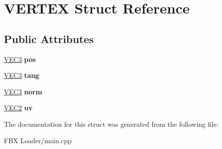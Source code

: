 \hypertarget{struct_v_e_r_t_e_x}{}\section{V\+E\+R\+T\+EX Struct Reference}
\label{struct_v_e_r_t_e_x}
\subsection*{Public Attributes}
\begin{DoxyCompactItemize}
\item 
\hyperlink{struct_v_e_c3}{V\+E\+C3} {\bfseries pos}\hypertarget{struct_v_e_r_t_e_x_a8ac4bfec22ae1ac3301d0a3c6f50f169}{}\label{struct_v_e_r_t_e_x_a8ac4bfec22ae1ac3301d0a3c6f50f169}

\item 
\hyperlink{struct_v_e_c3}{V\+E\+C3} {\bfseries tang}\hypertarget{struct_v_e_r_t_e_x_a92b8218d30b803645bbf543af434d759}{}\label{struct_v_e_r_t_e_x_a92b8218d30b803645bbf543af434d759}

\item 
\hyperlink{struct_v_e_c3}{V\+E\+C3} {\bfseries norm}\hypertarget{struct_v_e_r_t_e_x_a83fb6624f0b67adad803d7a5295eb88e}{}\label{struct_v_e_r_t_e_x_a83fb6624f0b67adad803d7a5295eb88e}

\item 
\hyperlink{struct_v_e_c2}{V\+E\+C2} {\bfseries uv}\hypertarget{struct_v_e_r_t_e_x_a36260bb428fd026cbc5753a3afb6c1b9}{}\label{struct_v_e_r_t_e_x_a36260bb428fd026cbc5753a3afb6c1b9}

\end{DoxyCompactItemize}


The documentation for this struct was generated from the following file\+:\begin{DoxyCompactItemize}
\item 
F\+B\+X Loader/main.\+cpp\end{DoxyCompactItemize}
